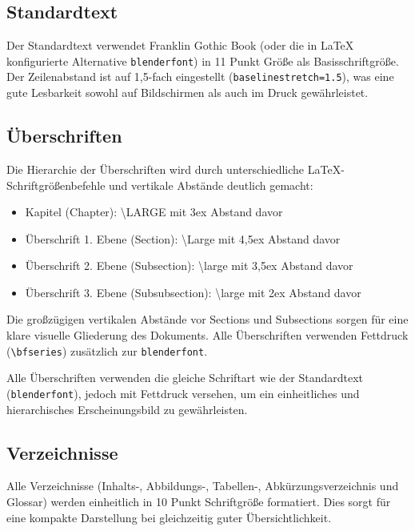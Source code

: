 \subsection*{Standardtext}
\label{subsec:standardtext}

Der Standardtext verwendet Franklin Gothic Book (oder die in \LaTeX{} konfigurierte Alternative \texttt{blenderfont}) in 11 Punkt Größe als Basisschriftgröße. Der Zeilenabstand ist auf 1,5-fach eingestellt (\texttt{baselinestretch=1.5}), was eine gute Lesbarkeit sowohl auf Bildschirmen als auch im Druck gewährleistet.

\subsection*{Überschriften}
\label{subsec:ueberschriften_format}

Die Hierarchie der Überschriften wird durch unterschiedliche \LaTeX{}-Schriftgrößenbefehle und vertikale Abstände deutlich gemacht:
\begin{itemize}
	\item Kapitel (Chapter): \textbackslash LARGE mit 3ex Abstand davor
	\item Überschrift 1. Ebene (Section): \textbackslash Large mit 4,5ex Abstand davor
	\item Überschrift 2. Ebene (Subsection): \textbackslash large mit 3,5ex Abstand davor
	\item Überschrift 3. Ebene (Subsubsection): \textbackslash large mit 2ex Abstand davor
\end{itemize}

Die großzügigen vertikalen Abstände vor Sections und Subsections sorgen für eine klare visuelle Gliederung des Dokuments. Alle Überschriften verwenden Fettdruck (\texttt{\textbackslash bfseries}) zusätzlich zur \texttt{blenderfont}.

Alle Überschriften verwenden die gleiche Schriftart wie der Standardtext (\texttt{blenderfont}), jedoch mit Fettdruck versehen, um ein einheitliches und hierarchisches Erscheinungsbild zu gewährleisten.

\subsection*{Verzeichnisse}
\label{subsec:verzeichnisse_format}

Alle Verzeichnisse (Inhalts-, Abbildungs-, Tabellen-, Abkürzungsverzeichnis und Glossar) werden einheitlich in 10 Punkt Schriftgröße formatiert. Dies sorgt für eine kompakte Darstellung bei gleichzeitig guter Übersichtlichkeit.


